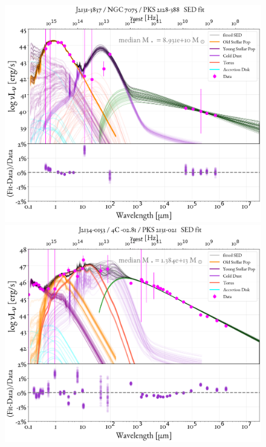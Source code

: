 \begin{figure}
    \centering
    \includegraphics[width=0.85\linewidth]{figures/ResultFits/77_SEDfit_4818.png}\\
    \includegraphics[width=0.85\linewidth]{figures/ResultFits/79_SEDfit_4827.png}    
\end{figure}
